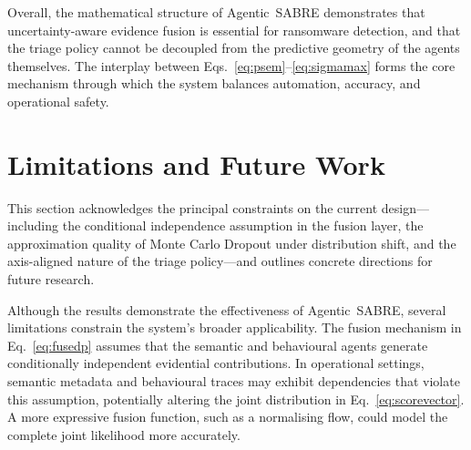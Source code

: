 \documentclass[3p]{elsarticle}
\begin{document}
\begin{table}[ht]
\centering
\caption{Measured inference latency and throughput per SABRE component (NVIDIA GB10 GPU, $T=10$ MC Dropout passes, $n=500$ repetitions). Full pipeline (B+S) is estimated as the serial sum of per-agent latencies plus fusion overhead.}
\label{tab:runtime_comparison}
\end{table}

Overall, the mathematical structure of Agentic~SABRE demonstrates that uncertainty-aware evidence fusion is essential for ransomware detection, and that the triage policy cannot be decoupled from the predictive geometry of the agents themselves. The interplay between Eqs.~\eqref{eq:psem}--\eqref{eq:sigmamax} forms the core mechanism through which the system balances automation, accuracy, and operational safety.

\section{Limitations and Future Work}
\label{sec:limitations}

This section acknowledges the principal constraints on the current design---including the
conditional independence assumption in the fusion layer, the approximation quality of Monte
Carlo Dropout under distribution shift, and the axis-aligned nature of the triage
policy---and outlines concrete directions for future research.

Although the results demonstrate the effectiveness of Agentic~SABRE, several limitations constrain the system’s broader applicability. The fusion mechanism in Eq.~\eqref{eq:fusedp} assumes that the semantic and behavioural agents generate conditionally independent evidential contributions. In operational settings, semantic metadata and behavioural traces may exhibit dependencies that violate this assumption, potentially altering the joint distribution in Eq.~\eqref{eq:scorevector}. A more expressive fusion function, such as a normalising flow, could model the complete joint likelihood more accurately.
\end{document}
